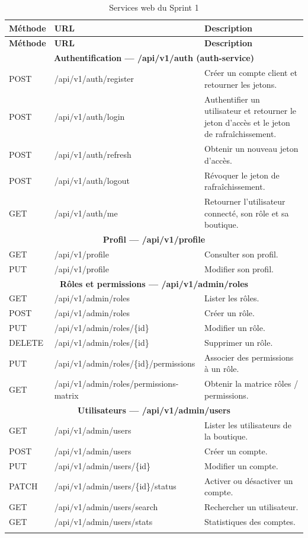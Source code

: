\renewcommand{\arraystretch}{1.15}
\setlength{\tabcolsep}{4pt}
\begin{longtable}{|p{1.5cm}|p{6.8cm}|p{6.2cm}|}
\hline
\textbf{Méthode} & \textbf{URL} & \textbf{Description} \\
\hline
\endfirsthead
\hline
\textbf{Méthode} & \textbf{URL} & \textbf{Description} \\
\hline
\endhead
\multicolumn{3}{|c|}{\textbf{Authentification --- /api/v1/auth (auth-service)}} \\
\hline
POST & /api/v1/auth/register & Créer un compte client et retourner les jetons. \\
\hline
POST & /api/v1/auth/login & Authentifier un utilisateur et retourner le jeton d'accès et le jeton de rafraîchissement. \\
\hline
POST & /api/v1/auth/refresh & Obtenir un nouveau jeton d'accès. \\
\hline
POST & /api/v1/auth/logout & Révoquer le jeton de rafraîchissement. \\
\hline
GET & /api/v1/auth/me & Retourner l'utilisateur connecté, son rôle et sa boutique. \\
\hline
\multicolumn{3}{|c|}{\textbf{Profil --- /api/v1/profile}} \\
\hline
GET & /api/v1/profile & Consulter son profil. \\
\hline
PUT & /api/v1/profile & Modifier son profil. \\
\hline
\multicolumn{3}{|c|}{\textbf{Rôles et permissions --- /api/v1/admin/roles}} \\
\hline
GET & /api/v1/admin/roles & Lister les rôles. \\
\hline
POST & /api/v1/admin/roles & Créer un rôle. \\
\hline
PUT & /api/v1/admin/roles/\{id\} & Modifier un rôle. \\
\hline
DELETE & /api/v1/admin/roles/\{id\} & Supprimer un rôle. \\
\hline
PUT & /api/v1/admin/roles/\{id\}/permissions & Associer des permissions à un rôle. \\
\hline
GET & /api/v1/admin/roles/permissions-matrix & Obtenir la matrice rôles / permissions. \\
\hline
\multicolumn{3}{|c|}{\textbf{Utilisateurs --- /api/v1/admin/users}} \\
\hline
GET & /api/v1/admin/users & Lister les utilisateurs de la boutique. \\
\hline
POST & /api/v1/admin/users & Créer un compte. \\
\hline
PUT & /api/v1/admin/users/\{id\} & Modifier un compte. \\
\hline
PATCH & /api/v1/admin/users/\{id\}/status & Activer ou désactiver un compte. \\
\hline
GET & /api/v1/admin/users/search & Rechercher un utilisateur. \\
\hline
GET & /api/v1/admin/users/stats & Statistiques des comptes. \\
\hline
\caption{Services web du Sprint 1}
\label{tab:ws-sprint1}
\end{longtable}

